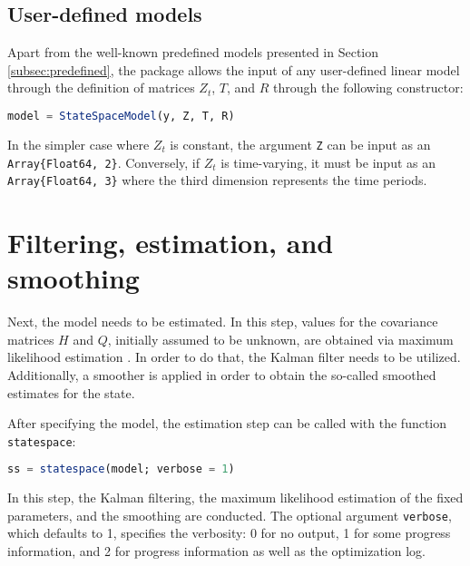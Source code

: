 \documentclass{juliacon}
\begin{document}
\subsection{User-defined models}

Apart from the well-known predefined models presented in Section \ref{subsec:predefined}, the package allows the input of any user-defined linear model through the definition of matrices $Z_{t}$, $T$, and $R$ through the following constructor:
%
\begin{lstlisting}[language = Julia]
model = StateSpaceModel(y, Z, T, R)
\end{lstlisting}

In the simpler case where $Z_{t}$ is constant, the argument \texttt{Z} can be input as an \texttt{Array\{Float64, 2\}}. Conversely, if $Z_{t}$ is time-varying, it must be input as an \texttt{Array\{Float64, 3\}} where the third dimension represents the time periods.

\section{Filtering, estimation, and smoothing} \label{sec:estimation}

Next, the model needs to be estimated. In this step, values for the covariance matrices $H$ and $Q$, initially assumed to be unknown, are obtained via maximum likelihood estimation \cite{casella2002statistical}. In order to do that, the Kalman filter needs to be utilized. Additionally, a smoother is applied in order to obtain the so-called smoothed estimates for the state.

After specifying the model, the estimation step can be called with the function \texttt{statespace}:
%
\begin{lstlisting}[language = Julia]
ss = statespace(model; verbose = 1)
\end{lstlisting}

In this step, the Kalman filtering, the maximum likelihood estimation of the fixed parameters, and the smoothing are conducted. The optional argument \texttt{verbose}, which defaults to 1, specifies the verbosity: 0 for no output, 1 for some progress information, and 2 for progress information as well as the optimization log.
\end{document}
